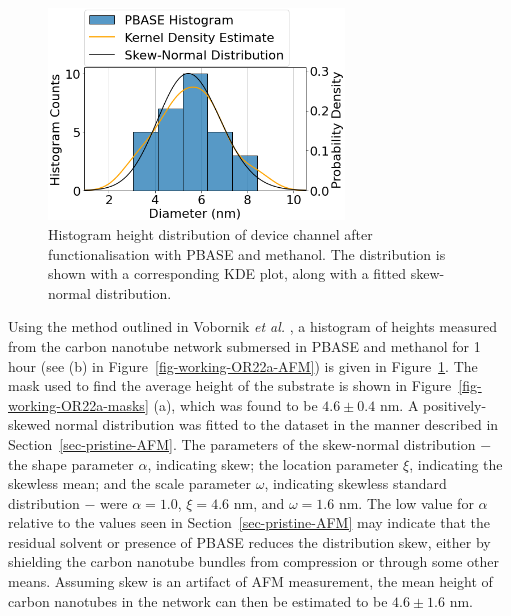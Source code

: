 \documentclass[
  a4paper,
]{scrbook}
\begin{document}
\begin{figure}

{\centering \includegraphics[width=0.7\textwidth,height=\textheight]{figures/ch8/DF2Q3D9_PBASE_cnt_histogram.png}

}

\caption{\label{fig-PBASE-histogram}Histogram height distribution of
device channel after functionalisation with PBASE and methanol. The
distribution is shown with a corresponding KDE plot, along with a fitted
skew-normal distribution.}

\end{figure}

Using the method outlined in Vobornik \emph{et al.}
\autocite{Vobornik2023}, a histogram of heights measured from the carbon
nanotube network submersed in PBASE and methanol for 1 hour (see (b) in
Figure~\ref{fig-working-OR22a-AFM}) is given in
Figure~\ref{fig-PBASE-histogram}. The mask used to find the average
height of the substrate is shown in Figure~\ref{fig-working-OR22a-masks}
(a), which was found to be \(4.6\pm0.4\) nm. A positively-skewed normal
distribution was fitted to the dataset in the manner described in
Section~\ref{sec-pristine-AFM}. The parameters of the skew-normal
distribution \(-\) the shape parameter \(\alpha\), indicating skew; the
location parameter \(\xi\), indicating the skewless mean; and the scale
parameter \(\omega\), indicating skewless standard distribution \(-\)
were \(\alpha = 1.0\), \(\xi = 4.6\) nm, and \(\omega = 1.6\) nm. The
low value for \(\alpha\) relative to the values seen in
Section~\ref{sec-pristine-AFM} may indicate that the residual solvent or
presence of PBASE reduces the distribution skew, either by shielding the
carbon nanotube bundles from compression or through some other means.
Assuming skew is an artifact of AFM measurement, the mean height of
carbon nanotubes in the network can then be estimated to be
\(4.6 \pm 1.6\) nm.
\end{document}
